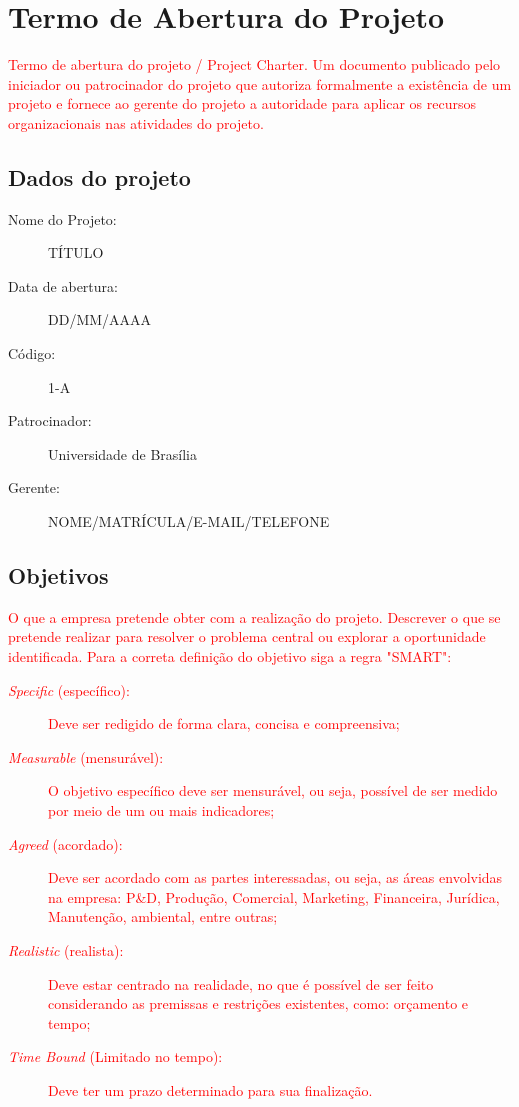 \chapter{Termo de Abertura do Projeto}

\textcolor{red}{Termo de abertura do projeto / Project Charter. Um documento publicado pelo iniciador ou patrocinador do projeto que autoriza formalmente a existência de um projeto e fornece ao gerente do projeto a autoridade para aplicar os recursos organizacionais nas atividades do projeto.}

\section{Dados do projeto}
\begin{description}
    \item [Nome do Projeto:] TÍTULO
    \item [Data de abertura:] DD/MM/AAAA
    \item [Código:] 1-A
    \item [Patrocinador:] Universidade de Brasília
    \item [Gerente:] NOME/MATRÍCULA/E-MAIL/TELEFONE
\end{description}

\section{Objetivos}
\textcolor{red}{O que a empresa pretende obter com a realização do projeto. Descrever o que se pretende realizar para resolver o problema central ou explorar a oportunidade identificada. Para a correta definição do objetivo siga a regra "SMART":
\begin{description}
    \item [\textit{Specific} (específico):] Deve ser redigido de forma clara, concisa e compreensiva;
    \item [\textit{Measurable} (mensurável):] O objetivo específico deve ser mensurável, ou seja, 
possível de ser medido por meio de um ou mais indicadores;
    \item [\textit{Agreed} (acordado):] Deve ser acordado com as partes interessadas, ou seja, as áreas envolvidas na empresa: P\&D, Produção, Comercial, Marketing, Financeira, Jurídica, Manutenção, ambiental, entre outras;
    \item [\textit{Realistic} (realista):] Deve estar centrado na realidade, no que é possível de ser feito considerando as premissas e restrições existentes, como: orçamento e tempo;
    \item [\textit{Time Bound} (Limitado no tempo):] Deve ter um prazo determinado para sua finalização.
\end{description}
}

